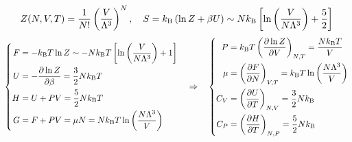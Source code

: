 \begin{theorem}[正则系综下单原子理想气体的热力学函数]
\[Z(N,V,T)=\frac{1}{N!}\left(\frac{V}{\Lambda^3}\right)^N,\quad S=k_{\rm B}\left(\ln Z+\beta U\right)\sim Nk_{\rm B}\left[\ln\left(\frac{V}{N\Lambda^3}\right)+\frac{5}{2}\right]\]
\[\left\{\begin{aligned}
F&=-k_{\rm B}T\ln Z\sim -Nk_{\rm B} T\left[\ln\left(\frac{V}{N\Lambda^3}\right)+1\right]\\
U&=-\pdv{\ln Z}{\beta}=\frac{3}{2}Nk_{\rm B} T\\
H&=U+PV=\frac{5}{2}Nk_{\rm B} T\\
G&=F+PV=\mu N=Nk_{\rm B} T\ln\left(\frac{N\Lambda^3}{V}\right)
\end{aligned}\right.
\quad \Rightarrow \quad
\left\{\begin{aligned}
P&=k_{\rm B} T\left(\pdv{\ln Z}{V}\right)_{N,T}=\frac{Nk_{\rm B} T}{V}\\
\mu&=\left(\pdv{F}{N}\right)_{V,T}=k_{\rm B} T\ln\left(\frac{N\Lambda^3}{V}\right)\\
C_V&=\left(\pdv{U}{T}\right)_{N,V}=\frac{3}{2}Nk_{\rm B}\\
C_P&=\left(\pdv{H}{T}\right)_{N,P}=\frac{5}{2}Nk_{\rm B}
\end{aligned}\right.\]
\end{theorem}

